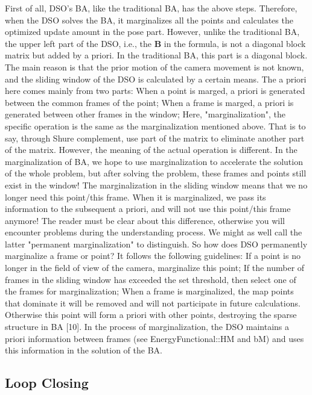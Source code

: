 \documentclass[a4paper,10pt]{article}
\begin{document}
	First of all, DSO's BA, like the traditional BA, has the above steps. Therefore, when the DSO solves the BA, it marginalizes all the points and calculates the optimized update amount in the pose part. However, unlike the traditional BA, the upper left part of the DSO, i.e., the $\mathbf{B}$ in the formula, is not a diagonal block matrix but added by a priori. In the traditional BA, this part is a diagonal block. The main reason is that the prior motion of the camera movement is not known, and the sliding window of the DSO is calculated by a certain means. The a priori here comes mainly from two parts:
	When a point is marged, a priori is generated between the common frames of the point;
	When a frame is marged, a priori is generated between other frames in the window;
	Here, "marginalization", the specific operation is the same as the marginalization mentioned above. That is to say, through Shure complement, use part of the matrix to eliminate another part of the matrix. However, the meaning of the actual operation is different. In the marginalization of BA, we hope to use marginalization to accelerate the solution of the whole problem, but after solving the problem, these frames and points still exist in the window! The marginalization in the sliding window means that we no longer need this point/this frame. When it is marginalized, we pass its information to the subsequent a priori, and will not use this point/this frame anymore! The reader must be clear about this difference, otherwise you will encounter problems during the understanding process. We might as well call the latter "permanent marginalization" to distinguish.
	So how does DSO permanently marginalize a frame or point? It follows the following guidelines:
	If a point is no longer in the field of view of the camera, marginalize this point;
	If the number of frames in the sliding window has exceeded the set threshold, then select one of the frames for marginalization;
	When a frame is marginalized, the map points that dominate it will be removed and will not participate in future calculations. Otherwise this point will form a priori with other points, destroying the sparse structure in BA [10].
	In the process of marginalization, the DSO maintains a priori information between frames (see EnergyFunctional::HM and bM) and uses this information in the solution of the BA.
	
	\subsection{Loop Closing}
		
	
	
	
\end{document}
